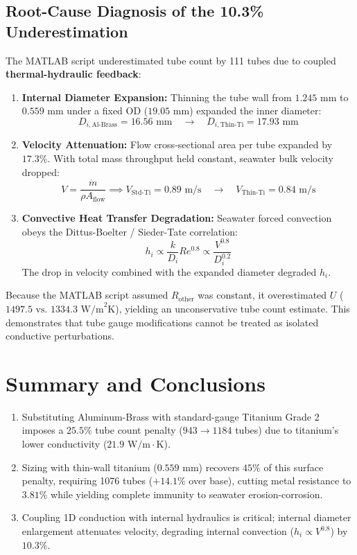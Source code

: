 \documentclass[12pt,a4paper]{article}
\begin{document}
\subsection{Root-Cause Diagnosis of the 10.3\% Underestimation}

The MATLAB script underestimated tube count by 111 tubes due to coupled \textbf{thermal-hydraulic feedback}:
\begin{enumerate}
    \item \textbf{Internal Diameter Expansion:} Thinning the tube wall from $1.245\text{ mm}$ to $0.559\text{ mm}$ under a fixed OD ($19.05\text{ mm}$) expanded the inner diameter:
    \begin{equation}
    D_{i,\text{Al-Brass}} = 16.56\text{ mm} \quad \longrightarrow \quad D_{i,\text{Thin-Ti}} = 17.93\text{ mm}
    \end{equation}
    \item \textbf{Velocity Attenuation:} Flow cross-sectional area per tube expanded by $17.3\%$. With total mass throughput held constant, seawater bulk velocity dropped:
    \begin{equation}
    V = \frac{\dot{m}}{\rho A_{\text{flow}}} \implies V_{\text{Std-Ti}} = 0.89\text{ m/s} \quad \longrightarrow \quad V_{\text{Thin-Ti}} = 0.84\text{ m/s}
    \end{equation}
    \item \textbf{Convective Heat Transfer Degradation:} Seawater forced convection obeys the Dittus-Boelter / Sieder-Tate correlation:
    \begin{equation}
    h_i \propto \frac{k}{D_i} Re^{0.8} \propto \frac{V^{0.8}}{D_i^{0.2}}
    \end{equation}
    The drop in velocity combined with the expanded diameter degraded $h_i$. 
\end{enumerate}
Because the MATLAB script assumed $R_{\text{other}}$ was constant, it overestimated $U$ ($1497.5\text{ vs. } 1334.3\text{ W/m}^2\text{K}$), yielding an unconservative tube count estimate. This demonstrates that tube gauge modifications cannot be treated as isolated conductive perturbations.

\section{Summary and Conclusions}

\begin{enumerate}
    \item Substituting Aluminum-Brass with standard-gauge Titanium Grade 2 imposes a $25.5\%$ tube count penalty ($943 \to 1184$ tubes) due to titanium's lower conductivity ($21.9\text{ W/m}\cdot\text{K}$).
    \item Sizing with thin-wall titanium ($0.559\text{ mm}$) recovers $45\%$ of this surface penalty, requiring 1076 tubes ($+14.1\%$ over base), cutting metal resistance to $3.81\%$ while yielding complete immunity to seawater erosion-corrosion.
    \item Coupling 1D conduction with internal hydraulics is critical; internal diameter enlargement attenuates velocity, degrading internal convection ($h_i \propto V^{0.8}$) by $10.3\%$.
\end{enumerate}
\end{document}
